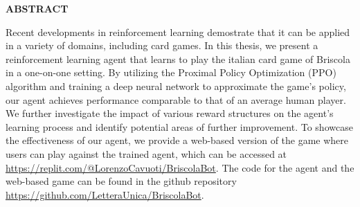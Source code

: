 \begin{center}
    \bf ABSTRACT
\end{center}
Recent developments in reinforcement learning demostrate that it can be applied in a variety of domains, including card games. In this thesis, we present a reinforcement learning agent that learns to play the italian card game of Briscola in a one-on-one setting. By utilizing the Proximal Policy Optimization (PPO) algorithm and training a deep neural network to approximate the game's policy, our agent achieves performance comparable to that of an average human player. We further investigate the impact of various reward structures on the agent's learning process and identify potential areas of further improvement. To showcase the effectiveness of our agent, we provide a web-based version of the game where users can play against the trained agent, which can be accessed at \href{https://replit.com/@LorenzoCavuoti/BriscolaBot}{https://replit.com/@LorenzoCavuoti/BriscolaBot}. The code for the agent and the web-based game can be found in the github repository \href{https://github.com/LetteraUnica/BriscolaBot}{https://github.com/LetteraUnica/BriscolaBot}.